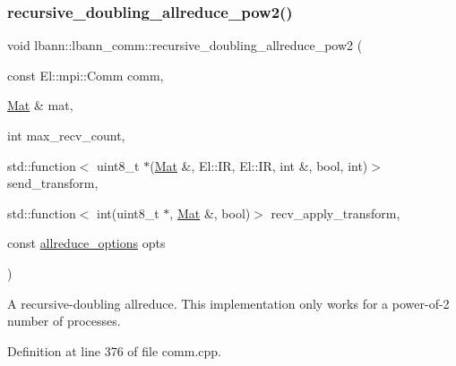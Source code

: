 \subsubsection{\texorpdfstring{recursive\+\_\+doubling\+\_\+allreduce\+\_\+pow2()}{recursive\_doubling\_allreduce\_pow2()}}
{\footnotesize\ttfamily void lbann\+::lbann\+\_\+comm\+::recursive\+\_\+doubling\+\_\+allreduce\+\_\+pow2 (\begin{DoxyParamCaption}\item[{const El\+::mpi\+::\+Comm}]{comm,  }\item[{\hyperlink{base_8hpp_a68f11fdc31b62516cb310831bbe54d73}{Mat} \&}]{mat,  }\item[{int}]{max\+\_\+recv\+\_\+count,  }\item[{std\+::function$<$ uint8\+\_\+t $\ast$(\hyperlink{base_8hpp_a68f11fdc31b62516cb310831bbe54d73}{Mat} \&, El\+::\+IR, El\+::\+IR, int \&, bool, int)$>$}]{send\+\_\+transform,  }\item[{std\+::function$<$ int(uint8\+\_\+t $\ast$, \hyperlink{base_8hpp_a68f11fdc31b62516cb310831bbe54d73}{Mat} \&, bool)$>$}]{recv\+\_\+apply\+\_\+transform,  }\item[{const \hyperlink{structlbann_1_1lbann__comm_1_1allreduce__options}{allreduce\+\_\+options}}]{opts }\end{DoxyParamCaption})}

A recursive-\/doubling allreduce. This implementation only works for a power-\/of-\/2 number of processes. 

Definition at line 376 of file comm.\+cpp.


